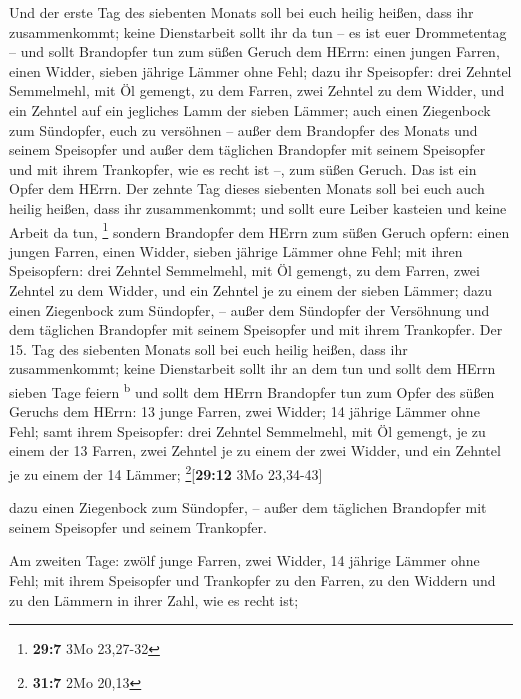  Und der erste Tag des siebenten Monats soll bei euch
heilig heißen, dass ihr zusammenkommt; keine Dienstarbeit sollt ihr da
tun -- es ist euer Drommetentag --  und sollt Brandopfer
tun zum süßen Geruch dem HErrn: einen jungen Farren, einen Widder,
sieben jährige Lämmer ohne Fehl;  dazu ihr Speisopfer:
drei Zehntel Semmelmehl, mit Öl gemengt, zu dem Farren, zwei Zehntel zu
dem Widder,  und ein Zehntel auf ein jegliches Lamm der
sieben Lämmer;  auch einen Ziegenbock zum Sündopfer, euch
zu versöhnen --  außer dem Brandopfer des Monats und
seinem Speisopfer und außer dem täglichen Brandopfer mit seinem
Speisopfer und mit ihrem Trankopfer, wie es recht ist --, zum süßen
Geruch. Das ist ein Opfer dem HErrn.  Der zehnte Tag
dieses siebenten Monats soll bei euch auch heilig heißen, dass ihr
zusammenkommt; und sollt eure Leiber kasteien und keine Arbeit da tun,
\footnote{\textbf{29:7} 3Mo 23,27-32}  sondern Brandopfer
dem HErrn zum süßen Geruch opfern: einen jungen Farren, einen Widder,
sieben jährige Lämmer ohne Fehl;  mit ihren Speisopfern:
drei Zehntel Semmelmehl, mit Öl gemengt, zu dem Farren, zwei Zehntel zu
dem Widder,  und ein Zehntel je zu einem der sieben
Lämmer;  dazu einen Ziegenbock zum Sündopfer, -- außer
dem Sündopfer der Versöhnung und dem täglichen Brandopfer mit seinem
Speisopfer und mit ihrem Trankopfer.  Der 15. Tag des
siebenten Monats soll bei euch heilig heißen, dass ihr zusammenkommt;
keine Dienstarbeit sollt ihr an dem tun und sollt dem HErrn sieben Tage
feiern \textsuperscript{b}  und sollt dem HErrn
Brandopfer tun zum Opfer des süßen Geruchs dem HErrn: 13 junge Farren,
zwei Widder; 14 jährige Lämmer ohne Fehl;  samt ihrem
Speisopfer: drei Zehntel Semmelmehl, mit Öl gemengt, je zu einem der 13
Farren, zwei Zehntel je zu einem der zwei Widder,  und
ein Zehntel je zu einem der 14 Lämmer; \footnote{\textbf{31:7} 2Mo 20,13}{[}\textbf{29:12}
3Mo 23,34-43{]}

 dazu einen Ziegenbock zum Sündopfer, -- außer dem
täglichen Brandopfer mit seinem Speisopfer und seinem Trankopfer.

 Am zweiten Tage: zwölf junge Farren, zwei Widder, 14
jährige Lämmer ohne Fehl;  mit ihrem Speisopfer und
Trankopfer zu den Farren, zu den Widdern und zu den Lämmern in ihrer
Zahl, wie es recht ist;

